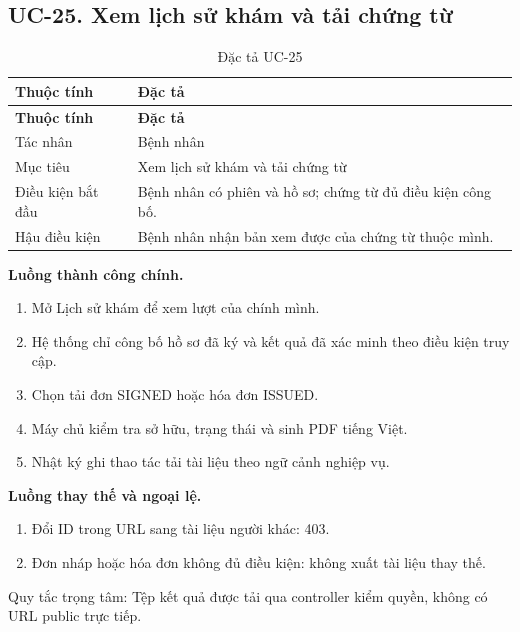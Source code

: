 \clearpage

\subsection{UC-25.\allowbreak{} Xem lịch sử khám và tải chứng từ}
\label{uc:25}

{\small\setlength{\tabcolsep}{3pt}\renewcommand{\arraystretch}{1.12}
\begin{longtable}{@{}L{\textwidth-1.32pt\relax} L{\textwidth-4.68pt\relax}@{}}
\caption{Đặc tả UC-25}\\
\toprule
\textbf{Thuộc tính} & \textbf{Đặc tả}\\\midrule
\endfirsthead
\toprule
\textbf{Thuộc tính} & \textbf{Đặc tả}\\\midrule
\endhead
\bottomrule\endlastfoot
Tác nhân & Bệnh nhân\\[3pt]
Mục tiêu & Xem lịch sử khám và tải chứng từ\\[3pt]
Điều kiện bắt đầu & Bệnh nhân có phiên và hồ sơ; chứng từ đủ điều kiện công bố.\allowbreak{}\\[3pt]
Hậu điều kiện & Bệnh nhân nhận bản xem được của chứng từ thuộc mình.\allowbreak{}\\[3pt]
\end{longtable}}
\noindent\textbf{Luồng thành công chính.}
\begin{enumerate}
\item Mở Lịch sử khám để xem lượt của chính mình.\allowbreak{}
\item Hệ thống chỉ công bố hồ sơ đã ký và kết quả đã xác minh theo điều kiện truy cập.\allowbreak{}
\item Chọn tải đơn SIGNED hoặc hóa đơn ISSUED.\allowbreak{}
\item Máy chủ kiểm tra sở hữu, trạng thái và sinh PDF tiếng Việt.\allowbreak{}
\item Nhật ký ghi thao tác tải tài liệu theo ngữ cảnh nghiệp vụ.\allowbreak{}
\end{enumerate}
\noindent\textbf{Luồng thay thế và ngoại lệ.}
\begin{enumerate}
\item Đổi ID trong URL sang tài liệu người khác:\allowbreak{} 403.\allowbreak{}
\item Đơn nháp hoặc hóa đơn không đủ điều kiện:\allowbreak{} không xuất tài liệu thay thế.\allowbreak{}
\end{enumerate}
Quy tắc trọng tâm:\allowbreak{} Tệp kết quả được tải qua controller kiểm quyền, không có URL public trực tiếp.\allowbreak{}

